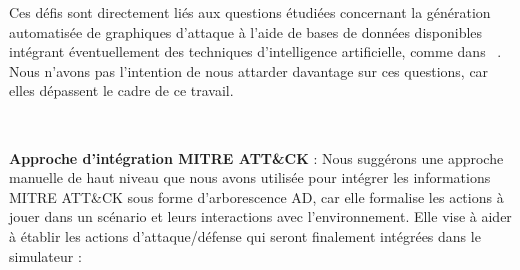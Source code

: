 Ces défis sont directement liés aux questions étudiées concernant la génération automatisée de graphiques d'attaque à l'aide de bases de données disponibles intégrant éventuellement des techniques d'intelligence artificielle, comme dans ~\cite{GFalco2018}. Nous n'avons pas l'intention de nous attarder davantage sur ces questions, car elles dépassent le cadre de ce travail.

\

\noindent
\textbf{Approche d'intégration MITRE ATT\&CK} : Nous suggérons une approche manuelle de haut niveau que nous avons utilisée pour intégrer les informations MITRE ATT\&CK sous forme d'arborescence AD, car elle formalise les actions à jouer dans un scénario et leurs interactions avec l'environnement. Elle vise à aider à établir les actions d'attaque/défense qui seront finalement intégrées dans le simulateur :
